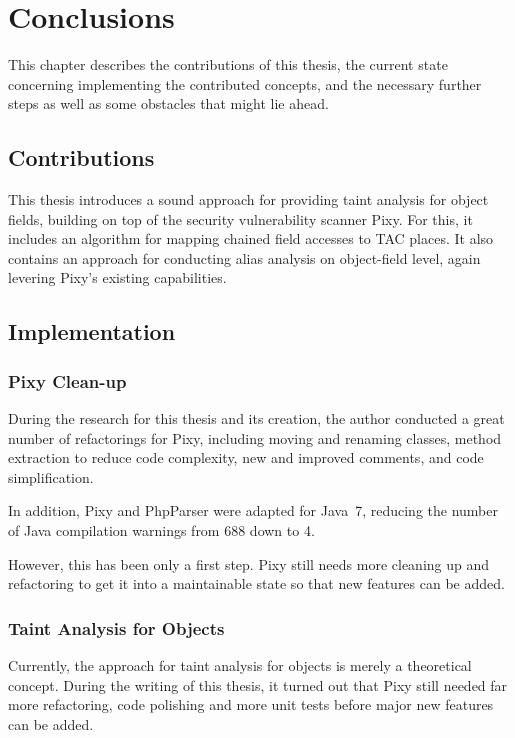 \chapter{Conclusions}
\label{conclusions}

This chapter describes the contributions of this thesis, the current state concerning implementing the contributed concepts, and the necessary further steps as well as some obstacles that might lie ahead.

\section{Contributions}

This thesis introduces a sound approach for providing taint analysis for object fields, building on top of the security vulnerability scanner Pixy. For this, it includes an algorithm for mapping chained field accesses to TAC places. It also contains an approach for conducting alias analysis on object-field level, again levering Pixy's existing capabilities.


\section{Implementation}

\subsection{Pixy Clean-up}

During the research for this thesis and its creation, the author conducted a great number of refactorings for Pixy, including moving and renaming classes, method extraction to reduce code complexity, new and improved comments, and code simplification.

In addition, Pixy and PhpParser were adapted for Java~7, reducing the number of Java compilation warnings from 688 down to 4.

However, this has been only a first step. Pixy still needs more cleaning up and refactoring to get it into a maintainable state so that new features can be added.


\subsection{Taint Analysis for Objects}

Currently, the approach for taint analysis for objects is merely a theoretical concept. During the writing of this thesis, it turned out that Pixy still needed far more refactoring, code polishing and more unit tests before major new features can be added.



